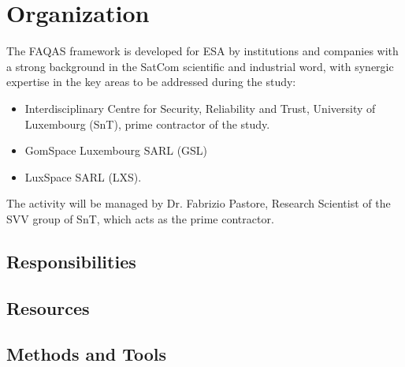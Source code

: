 \chapter{Organization}
\label{chapter:organization}


The FAQAS framework is developed for ESA by institutions and companies with a strong background in the SatCom
scientific and industrial word, with synergic expertise in the key areas to be addressed during
the study:
\begin{itemize}
  \item Interdisciplinary Centre for Security, Reliability and Trust, University of Luxembourg (SnT), prime contractor of the study.
  \item GomSpace Luxembourg SARL (GSL)
  \item LuxSpace SARL (LXS).
\end{itemize}

The activity will be managed by Dr. Fabrizio Pastore, Research Scientist of the SVV group of SnT, which acts as the prime contractor.

\section{Responsibilities}
\label{sec:resp}


\section{Resources}
\label{sec:resources}


\section{Methods and Tools}

